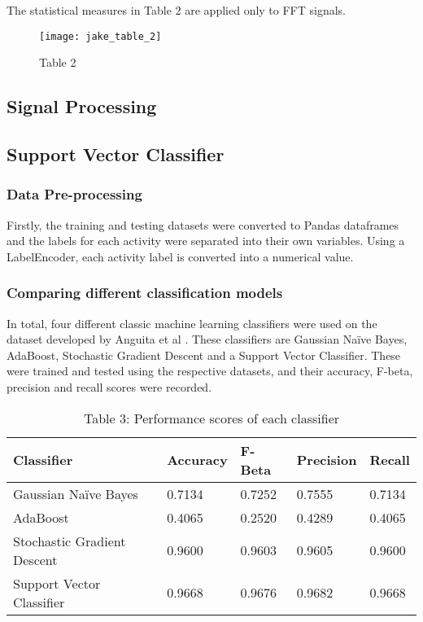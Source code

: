     The statistical measures in Table 2 are applied only to FFT signals.

    \begin{figure}[H]
        \centering
        \texttt{[image: jake\_table\_2]}\hfill
        \caption*{Table 2}
    \end{figure}

\subsection{Signal Processing}

\subsection{Support Vector Classifier}
\subsubsection{Data Pre-processing}
    Firstly, the training and testing datasets were converted to Pandas dataframes and the labels for each activity were separated into their own variables.
    Using a LabelEncoder, each activity label is converted into a numerical value.

\subsubsection{Comparing different classification models}
    In total, four different classic machine learning classifiers were used on the dataset developed by Anguita et al \cite{Anguita2012}. These classifiers are Gaussian Naïve Bayes,
    AdaBoost, Stochastic Gradient Descent and a Support Vector Classifier. These were trained and tested using the respective datasets, and their accuracy,
    F-beta, precision and recall scores were recorded.

    \begin{table}[ht]
        \centering\scriptsize
        \begin{tabular}{|l|l|l|l|l|}
            \hline
            \textbf{Classifier} & \textbf{Accuracy} & \textbf{F-Beta}  & \textbf{Precision} & \textbf{Recall} \\ \hline
            Gaussian Naïve Bayes             & 0.7134           & 0.7252  & 0.7555 & 0.7134 \\ \hline
            AdaBoost            & 0.4065           & 0.2520 & 0.4289 & 0.4065 \\ \hline
            Stochastic Gradient Descent               & 0.9600           & 0.9603 & 0.9605 & 0.9600 \\ \hline
            Support Vector Classifier            & 0.9668           & 0.9676 & 0.9682 & 0.9668 \\ \hline
        \end{tabular}
        \caption*{Table 3: Performance scores of each classifier}
    \end{table}

